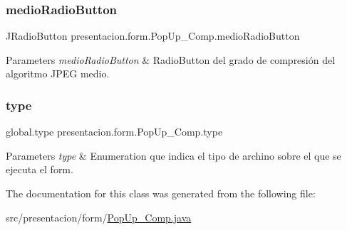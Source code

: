 \subsubsection{\texorpdfstring{medio\+Radio\+Button}{medioRadioButton}}
{\footnotesize\ttfamily J\+Radio\+Button presentacion.\+form.\+Pop\+Up\+\_\+\+Comp.\+medio\+Radio\+Button\hspace{0.3cm}{\ttfamily [private]}}


\begin{DoxyParams}{Parameters}
{\em medio\+Radio\+Button} & Radio\+Button del grado de compresión del algoritmo J\+P\+EG medio. \\
\hline
\end{DoxyParams}
\mbox{\label{classpresentacion_1_1form_1_1PopUp__Comp_af1981117e5555e0308d7e4a0f61db50b}} 
\subsubsection{\texorpdfstring{type}{type}}
{\footnotesize\ttfamily global.\+type presentacion.\+form.\+Pop\+Up\+\_\+\+Comp.\+type\hspace{0.3cm}{\ttfamily [private]}}


\begin{DoxyParams}{Parameters}
{\em type} & Enumeration que indica el tipo de archino sobre el que se ejecuta el form. \\
\hline
\end{DoxyParams}


The documentation for this class was generated from the following file\+:\begin{DoxyCompactItemize}
\item 
src/presentacion/form/\hyperlink{PopUp__Comp_8java}{Pop\+Up\+\_\+\+Comp.\+java}\end{DoxyCompactItemize}
